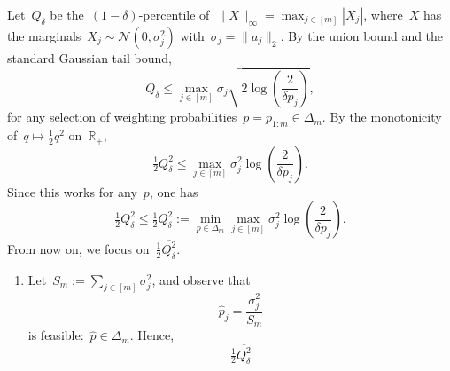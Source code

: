 \documentclass[11pt]{article}
\newcommand{\odima}[1]{{\color{red} #1}}
\newcommand{\R}{\mathds{R}}
\newcommand{\cN}{\mathcal{N}}
\newcommand{\leqs}{\leqslant}
\renewcommand{\le}{\leqs}
\begin{document}
\odima{
\noindent
Let~$Q_\delta$ be the~$(1-\delta)$-percentile of~$\|X\|_{\infty} = \max_{j \in [m]} |X_j|$, where~$X$ has the marginals~$X_j \sim \cN(0,\sigma_j^2)$ with~$\sigma_j = \|a_j\|_2$. By the union bound and the standard Gaussian tail bound,  
\[
Q_{\delta} \le \max_{j \in [m]} \sigma_j \sqrt{2\log\left(\frac{2}{\delta p_j}\right)},
\]
for any selection of weighting probabilities~$p = p_{1:m} \in \Delta_m$. By the monotonicity of~$q \mapsto \frac{1}{2} q^2$ on~$\R_+$,
\[
\tfrac{1}{2} Q_{\delta}^2 \le \max_{j \in [m]} \sigma_j^2 \log\left(\frac{2}{\delta p_j}\right).
\]
Since this works for any~$p$, one has 
\[
\tfrac{1}{2} Q_{\delta}^2 
\le \tfrac{1}{2}\overline{Q_\delta^2} := \min_{p \in \Delta_m} \max_{j \in [m]} \sigma_j^2 \log\left(\frac{2}{\delta p_j}\right). 
\]
From now on, we focus on~$\tfrac{1}{2}\overline{Q_\delta^2}$.
\begin{enumerate}
\item
Let~$S_m := \sum_{j \in [m]} \sigma_j^2$, and observe that
\[
\hat p_j = \frac{\sigma_j^2}{S_m}
\]
is feasible:~$\hat p \in \Delta_m$. Hence,
\begin{equation}
\tfrac{1}{2}\overline{Q_\delta^2} 

\end{equation}
\end{enumerate}}
\end{document}
